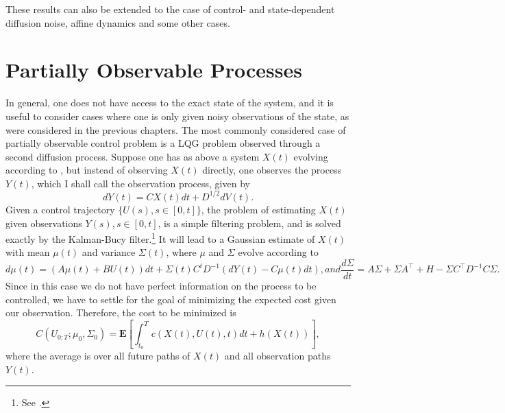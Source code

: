 These results can also be extended to the case of control- and state-dependent diffusion noise, affine dynamics and some other cases.

\section{Partially Observable Processes}

In general, one does not have access to the exact state of the system, and it is useful to consider cases where one is only given noisy observations of the state, as were considered in 
the previous chapters. The most commonly considered case of partially observable control problem is a LQG problem observed through a second diffusion process. Suppose one has 
as above a system $X(t)$ evolving according to , but instead of observing $X(t)$ directly, one observes the process $Y(t)$, which I shall call the 
observation process, given by
\begin{equation}
\label{eqn:ctl_obs_dyn}
dY(t) = C X(t) dt + D^{1/2} dV(t).
\end{equation}
Given a control trajectory $\{U(s), s\in [0,t]\}$, the problem of estimating $X(t)$ given observations ${Y(s), s \in [0,t]}$, is a simple filtering problem, and is solved exactly by the Kalman-Bucy filter.\footnote{See .} It will lead to a Gaussian estimate of $X(t)$ with mean $\mu(t)$ and variance $\Sigma(t)$, where $\mu$ and $\Sigma$ evolve according to
\begin{subequations}
\label{eq:ctl_kalman_bucy}
\begin{equation}
d\mu(t) = (A \mu(t) + B U(t))dt + \Sigma(t) C^t D^{-1} \left(dY(t) - C\mu(t) dt\right),
\label{eq:ctl_kalman_bucy_mean}
\end{equation}
and
\begin{equation}
\label{eq:ctl_kalman_bucy_var}
\frac{d\Sigma}{dt} = A \Sigma + \Sigma A^\top + H - \Sigma C^\top D^{-1} C \Sigma.
\end{equation}
\end{subequations}
Since in this case we do not have perfect information on the process to be controlled, we have to settle for the goal of minimizing the expected cost given our observation. Therefore, the cost to be minimized is
$$
C(U_{0:T};\mu_0,\Sigma_0) = \boldsymbol{E}\left[\int_{t_0}^T c(X(t),U(t),t)dt +h(X(t))\right],
$$
where the average is over all future paths of $X(t)$ and all observation paths $Y(t)$.
